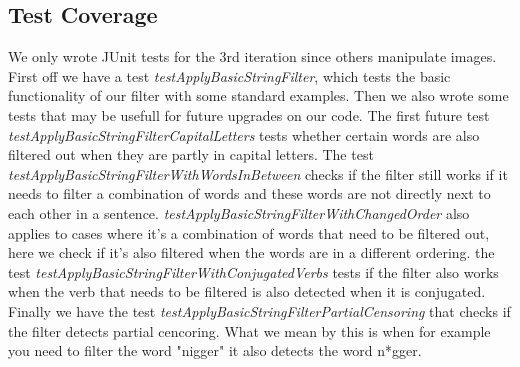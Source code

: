\subsection{Test Coverage}
We only wrote JUnit tests for the 3rd iteration since others manipulate images.
First off we have a test \textit{testApplyBasicStringFilter}, which tests the basic functionality of our filter with some standard examples. 
Then we also wrote some tests that may be usefull for future upgrades on our code.
The first future test \textit{testApplyBasicStringFilterCapitalLetters} tests whether certain words 
are also filtered out when they are partly in capital letters. 
The test \textit{testApplyBasicStringFilterWithWordsInBetween} checks if the filter still works if 
it needs to filter a combination of words and these words are not directly next to each other in a sentence.
\textit{testApplyBasicStringFilterWithChangedOrder} also applies to cases where it's a combination of
words that need to be filtered out, here we check if it's also filtered when the words are in a different 
ordering.
the test \textit{testApplyBasicStringFilterWithConjugatedVerbs} tests if the filter also works when the 
verb that needs to be filtered is also detected when it is conjugated.
Finally we have the test \textit{testApplyBasicStringFilterPartialCensoring} that checks if the filter detects 
partial cencoring. What we mean by this is when for example you need to filter the word "nigger" it also
detects the word n*gger.

